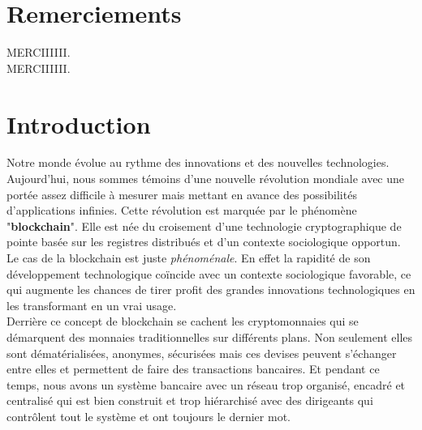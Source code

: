 \documentclass[12pt]{report}
\begin{document}
\newpage
\section{Remerciements}
\hspace{1cm} MERCIIIIII.\\ 

\hspace{1cm} MERCIIIIII.\\ 


\newpage
\renewcommand{\contentsname}{Table des matières}
\tableofcontents
\pagebreak


\section{Introduction}
\hspace{1cm} Notre monde évolue au rythme des innovations et des nouvelles technologies. Aujourd'hui, nous sommes témoins d'une nouvelle révolution mondiale avec une portée assez difficile à mesurer mais mettant en avance des possibilités d'applications infinies. Cette révolution est marquée par le phénomène "\textbf{blockchain}". Elle est née du croisement d'une technologie cryptographique de pointe basée sur les registres distribués et d'un contexte sociologique opportun. Le cas de la blockchain est juste \textit{phénoménale}. En effet la rapidité de son développement technologique coïncide avec un contexte sociologique favorable, ce qui augmente les chances de tirer profit des grandes innovations technologiques en les transformant en un vrai usage. \\

\hspace{1cm} Derrière ce concept de blockchain se cachent les cryptomonnaies qui se \\démarquent des monnaies traditionnelles sur différents plans. Non seulement elles sont dématérialisées, anonymes, sécurisées mais ces devises peuvent s'échanger entre elles et permettent de faire des transactions bancaires. Et pendant ce temps, nous avons un système bancaire avec un réseau trop organisé, encadré et centralisé qui est bien construit et trop hiérarchisé avec des dirigeants qui contrôlent tout le système et ont toujours le dernier mot.\\
\end{document}

